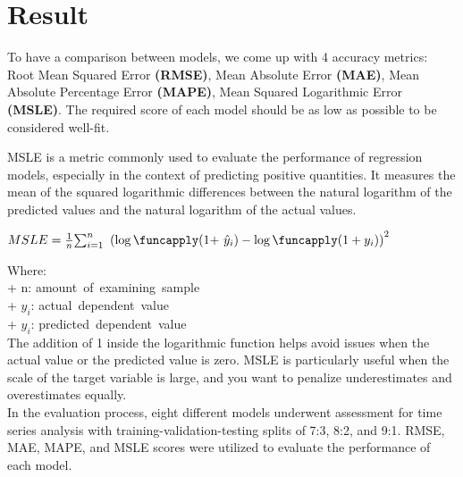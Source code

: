 \documentclass{ieeeojies}
\begin{document}
{\begin{flushleft}
\end{flushleft}

\section{Result}

\begin{flushleft}
\hspace{0.4cm}To have a comparison between models, we come up with 4 accuracy metrics: Root Mean Squared Error \textbf{(RMSE)}, Mean Absolute Error \textbf{(MAE)}, Mean Absolute Percentage Error \textbf{(MAPE)}, Mean Squared Logarithmic Error \textbf{(MSLE)}. The required score of each model should be as low as possible to be considered well-fit.

\begin{flushleft}
    MSLE is a metric commonly used to evaluate the performance of regression models, especially in the context of predicting positive quantities. It measures the mean of the squared logarithmic differences between the natural logarithm of the predicted values and the natural logarithm of the actual values.
\end{flushleft}
\centering $MSLE=\frac{1}{n}{\sum_{i=1}^{n}{\ (\log\funcapply(1+\ }{\hat{y}}_i)-\log\funcapply(1+y_i))}^2\ $\\
\begin{flushleft}
 \hspace{0.4cm}Where:\\

     + n: amount\ of\ examining\ sample\\
     + $y_i$: actual\ dependent\ value\\
     + ${\hat{y}}_i$: predicted\ dependent\ value\\

 
\hspace{0.4cm}The addition of 1 inside the logarithmic function helps avoid issues when the actual value or the predicted value is zero. MSLE is particularly useful when the scale of the target variable is large, and you want to penalize underestimates and overestimates equally.    \\

\hspace{0.4cm}In the evaluation process, eight different models underwent assessment for time series analysis with training-validation-testing splits of 7:3, 8:2, and 9:1. RMSE, MAE, MAPE, and MSLE scores were utilized to evaluate the performance of each model.\\
 \end{flushleft}
\end{flushleft}

}
\end{document}
